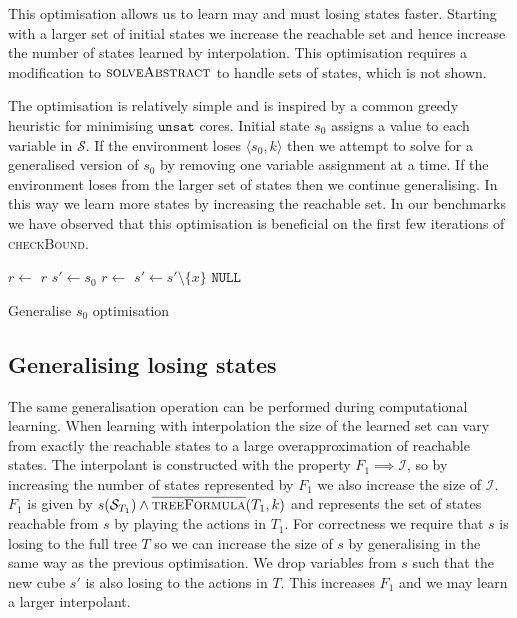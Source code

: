 This optimisation allows us to learn may and must losing states faster.
Starting with a larger set of initial states we increase the reachable set and
hence increase the number of states learned by interpolation. This optimisation
requires a modification to $\textsc{solveAbstract}$ to handle sets of states,
which is not shown.

The optimisation is relatively simple and is inspired by a common greedy
heuristic for minimising $\texttt{unsat}$ cores. Initial state $s_0$ assigns a value to
each variable in $\mathcal{S}$. If the environment loses $\langle s_0, k
\rangle$ then we attempt to solve for a generalised version of $s_0$ by removing
one variable assignment at a time. If the environment loses from the larger set of
states then we continue generalising. In this way we learn more
states by increasing the reachable set. In our benchmarks we have observed that
this optimisation is beneficial on the first few iterations of
\textsc{checkBound}.

\begin{algorithm}
    \begin{algorithmic}
            \State $r \gets $ 
             \Return $r$ \EndIIf
            \State $s' \gets s_0$
            \State $r \gets$  
                    \State $s' \gets s' \setminus \{x\}$ 
                \EndIf 
            \EndFor
            \State \Return $\texttt{NULL}$
        \EndFunction
    \end{algorithmic}
    \caption{Generalise $s_0$ optimisation}
    \label{alg:opt1}
\end{algorithm}

\subsection{Generalising losing states}

The same generalisation operation can be performed during computational learning. When learning with interpolation the size of the learned set can vary from exactly the reachable states to a large overapproximation of reachable states. The interpolant is constructed with the property $F_1 \implies \mathcal{I}$, so by increasing the number of states represented by $F_1$ we also increase the size of $\mathcal{I}$. $F_1$ is given by $s(\mathcal{S}_{T_1}) \land \textsc{$\overline{\mbox{treeFormula}}$}(T_1, k)$ and represents the set of states reachable from $s$ by playing the actions in $T_1$. For correctness we require that $s$ is losing to the full tree $T$ so we can increase the size of $s$ by generalising in the same way as the previous optimisation. We drop variables from $s$ such that the new cube $s'$ is also losing to the actions in $T$. This increases $F_1$ and we may learn a larger interpolant.

